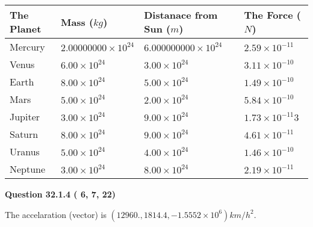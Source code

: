 \documentclass[12pt]{article}
\begin{document}
 
\begin{tabular}{|l|l|l|l|}
\hline
The Planet & Mass ($kg$) & Distanace from Sun ($m$) & The Force ($N$)\\
\hline
Mercury  &
           $ %
2.00000000 \times 10^{24}  $   &
             $ %
6.000000000 \times 10^{24}$    & $ %
2.59 \times 10^{-11} $
\\  \hline
Venus    &
           $  %
6.00 \times 10^{24}  $     &
             $ %
3.00 \times 10^{24} $    & $ %
3.11 \times 10^{-10} $
\\  \hline
Earth    &
           $  %
8.00 \times 10^{24}$     &
             $ %
5.00 \times 10^{24} $    & $ %
1.49 \times 10^{-10} $
\\   \hline
Mars     &
           $  %
5.00 \times 10^{24} $     &
             $ %
2.00 \times 10^{24}$    & $ %
5.84 \times 10^{-10} $
\\   \hline
Jupiter  &
           $  %
3.00 \times 10^{24}  $    &
             $ %
9.00 \times 10^{24} $    & $ %
1.73 \times 10^{-11}3 $
\\  \hline
Saturn   &
           $  %
8.00 \times 10^{24}   $    &
             $ %
9.00 \times 10^{24}  $    & $ %
4.61 \times 10^{-11} $
\\  \hline
Uranus   &
           $  %
5.00 \times 10^{24} $    &
             $ %
4.00 \times 10^{24}$    & $ %
1.46 \times 10^{-10} $
\\  \hline
Neptune  &
           $  %
3.00 \times 10^{24}  $    &
             $ %
8.00 \times 10^{24} $    & $ %
2.19 \times 10^{-11} $
\\  \hline
 
\end{tabular}
 
 
 
 
  
\vspace{0.2in}
  
{\textbf{\Large{Question
32.1.4 
 (          6,          7,         22)
}}}
  
  
 
 
\noindent{}
 
 
The accelaration (vector) is
$(
12960.,
1814.4 ,
-1.5552 \times 10^{6}
)km/h^2.
$
 
 
 
 
 
 
\noindent{}
\end{document}
